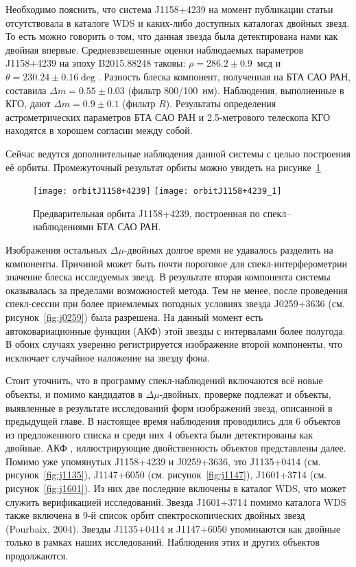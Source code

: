 Необходимо пояснить, что система J1158+4239 на момент публикации статьи отсутствовала в каталоге WDS и каких-либо доступных каталогах двойных звезд. То есть можно говорить о том, что данная звезда была детектирована нами как двойная впервые. Средневзвешенные оценки наблюдаемых параметров J1158+4239 на  эпоху B2015.88248 таковы: $\rho = 286.2\pm0.9$~мсд и $\theta=230.24\pm0.16\deg$. Разность блеска компонент, полученная на БТА САО РАН, составила $\Delta m = 0.55\pm0.03$ (фильтр 800/100~нм). Наблюдения, выполненные в КГО, дают $\Delta m = 0.9\pm0.1$ (фильтр $R$). Результаты определения астрометрических параметров БТА САО РАН и 2.5-метрового телескопа КГО находятся в хорошем согласии между собой.  

Сейчас ведутся дополнительные наблюдения данной системы с целью построения её орбиты. Промежуточный результат орбиты можно увидеть на рисунке~\ref{fig:orbit}


\begin{figure}
\centering
\texttt{[image: orbitJ1158+4239]}
\texttt{[image: orbitJ1158+4239\_1]}
\caption{Предварительная орбита J1158+4239, построенная по спекл--наблюдениями БТА САО РАН.}
\label{fig:orbit}
\end{figure}


Изображения остальных $\Delta\mu$-двойных долгое время не удавалось разделить на компоненты. Причиной может быть почти пороговое для спекл-интерферометрии значение блеска исследуемых звезд. В результате вторая компонента системы оказывалась за пределами возможностей метода. Тем не менее, после проведения спекл-сессии при более приемлемых погодных условиях звезда  J0259+3636 (см. рисунок~\ref{fig:j0259}) была разрешена. На данный момент есть автоковариационные функции (АКФ) этой звезды с интервалами более полугода. В обоих случаях уверенно регистрируется изображение второй компоненты, что исключает случайное наложение на звезду фона.

Стоит уточнить, что в программу спекл-наблюдений включаются всё новые объекты, и помимо кандидатов в $\Delta\mu$-двойных, проверке подлежат и объекты, выявленные в результате исследований форм изображений звезд, описанной в предыдущей главе. В настоящее время наблюдения проводились для 6 объектов из предложенного списка и среди них  4 объекта были детектированы как двойные. АКФ , иллюстрирующие двойственность объектов представлены далее. Помимо уже упомянутых J1158+4239 и J0259+3636, это  J1135+0414 (см. рисунок~\ref{fig:j1135}), J1147+6050 (см. рисунок~\ref{fig:j1147}), J1601+3714 (см. рисунок~\ref{fig:j1601}). Из них две последние включены в каталог WDS, что может служить верификацией исследований. Звезда J1601+3714 помимо каталога WDS также включена в 9-й список орбит спектроскопических двойных звезд (Pourbaix, 2004). Звезды J1135+0414 и J1147+6050 упоминаются как двойные только в рамках наших исследований. Наблюдения этих и других объектов продолжаются.

